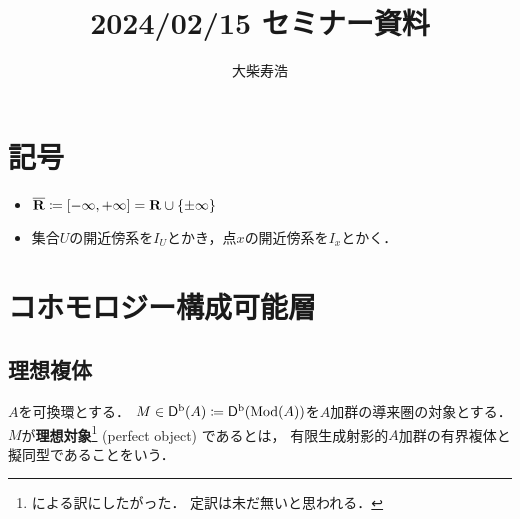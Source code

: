 
\def\inner<#1>{\langle #1 \rangle}








\title{2024/02/15 セミナー資料}
\author{大柴寿浩}
\date{}

\maketitle

\section*{記号}
\begin{itemize}
    \item \(\overline{\mathbf{R}}\coloneqq \left[-\infty,+\infty\right]=\mathbf{R}\cup\{\pm\infty\}\)
    \item 集合\(U\)の開近傍系を\(I_U\)とかき，点\(x\)の開近傍系を\(I_x\)とかく．
\end{itemize}
\section{コホモロジー構成可能層}
\subsection{理想複体}
\(A\)を可換環とする．
\(M\in\mathop{\mathsf{D}^\mathrm{b}}\nolimits(A)\coloneqq \mathop{\mathsf{D}^\mathrm{b}}\nolimits(\mathop{\mathrm{Mod}}\nolimits(A))\)を\(A\)加群の導来圏の対象とする．
\(M\)が\textbf{理想対象}\footnote{
    \cite{Ue}による訳にしたがった．
    定訳は未だ無いと思われる．
} (perfect object) であるとは，
有限生成射影的\(A\)加群の有界複体と擬同型であることをいう．

